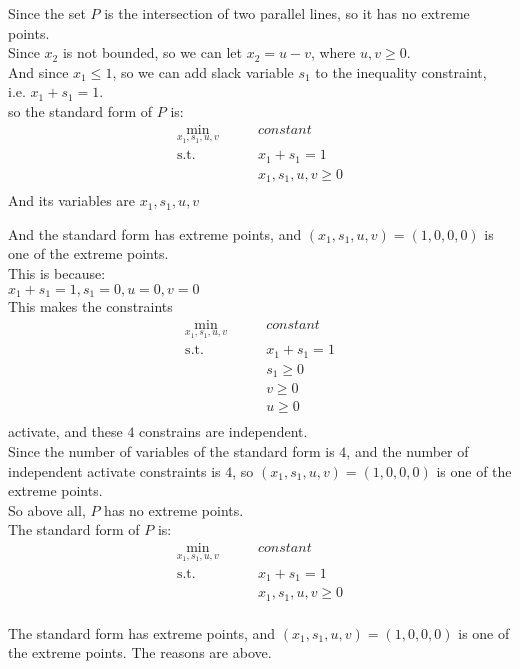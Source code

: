 \documentclass[10pt]{article}
\begin{document}
Since the set $P$ is the intersection of two parallel lines, so it has no extreme points.\\

Since $x_2$ is not bounded, so we can let $x_2=u-v$, where $u,v\geq 0$.\\
And since $x_1\leq 1$, so we can add slack variable $s_1$ to the inequality constraint,\\
i.e. $x_1+s_1=1$.\\

so the standard form of $P$ is:\\
\begin{equation}
	\begin{aligned}
		\min_{x_1,s_1,u,v}\qquad & constant \\ 
		\mathrm{s.t.}\qquad & x_1+s_1=1 \\
							& x_1,s_1,u,v\geq 0 \\
	\end{aligned}
\end{equation}
And its variables are $x_1,s_1,u,v$

And the standard form has extreme points, and $(x_1,s_1,u,v)=(1,0,0,0)$ is one of the extreme points.\\
This is because:\\
$x_1+s_1=1, s_1=0, u=0, v=0$\\
This makes the constraints 
\begin{equation}
	\begin{aligned}
		\min_{x_1,s_1,u,v}\qquad & constant \\ 
		\mathrm{s.t.}\qquad & x_1+s_1=1 \\
							& s_1\geq 0 \\
							& v\geq 0 \\
							& u\geq 0 \\
	\end{aligned}
\end{equation}
activate, and these $4$ constrains are independent.\\
Since the number of variables of the standard form is $4$, and the number of independent activate constraints is $4$, so $(x_1,s_1,u,v)=(1,0,0,0)$ is one of the extreme points.\\ 


So above all, $P$ has no extreme points.\\
The standard form of $P$ is:\\
\begin{equation}
	\begin{aligned}
		\min_{x_1,s_1,u,v}\qquad & constant \\ 
		\mathrm{s.t.}\qquad & x_1+s_1=1 \\
							& x_1,s_1,u,v\geq 0 \\
	\end{aligned}
\end{equation}

The standard form has extreme points, and $(x_1,s_1,u,v)=(1,0,0,0)$ is one of the extreme points. The reasons are above.\\
\end{document}
